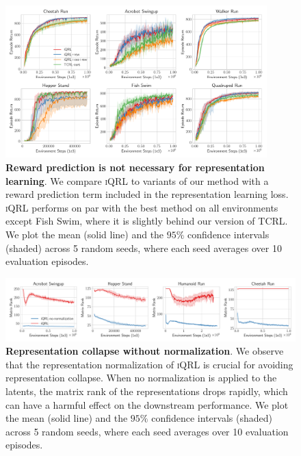 \documentclass{article}
\theoremstyle{plain}
\theoremstyle{definition}
\theoremstyle{remark}
\newcommand{\our}{\textsc{iQRL}\xspace}
\begin{document}
\begin{figure}[ht]
\vskip 0.2in
\begin{center}
\centerline{\includegraphics[width=0.9\textwidth]{./figs/reward-ablation.pdf}}
\caption{\textbf{Reward prediction is not necessary for representation learning}. We compare \our to variants of our method with a reward prediction term included in the representation learning loss. \our performs on par with the best method on all environments except Fish Swim, where it is slightly behind our version of TCRL. We plot the mean (solid line) and the $95\%$ confidence intervals (shaded) across 5 random seeds, where each seed averages over 10 evaluation episodes.}
\label{fig:reward-ablation}
\end{center}
\vskip -0.2in
\end{figure}

\begin{figure}[ht]
	\vskip 0.2in
	\begin{center}
		\centerline{\includegraphics[width=1.0\textwidth]{./figs/rank-comparison-z1.pdf}}
		\caption{\textbf{Representation collapse without normalization}. We observe that the representation normalization of \our is crucial for avoiding representation collapse. When no normalization is applied to the latents, the matrix rank of the representations drops rapidly, which can have a harmful effect on the downstream performance. We plot the mean (solid line) and the $95\%$ confidence intervals (shaded) across 5 random seeds, where each seed averages over 10 evaluation episodes.}
		\label{fig:rank-comparison-z1}
	\end{center}
	\vskip -0.2in
\end{figure}
\end{document}
